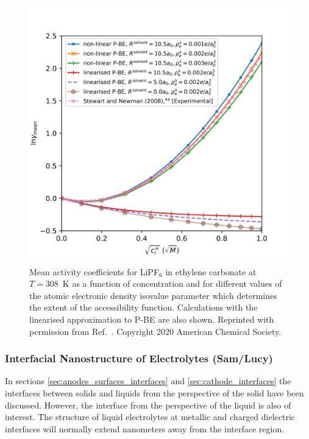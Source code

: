 \documentclass[../main.tex]{subfiles}
\begin{document}
\begin{figure}
    \includegraphics[scale=0.8]{figures/lipf6.png}
    \caption{Mean activity coefficients for LiPF$_6$ in ethylene carbonate at $T=308$~K as a function of concentration and for different values of the atomic electronic density isovalue parameter which determines the extent of the accessibility function. Calculations with the linearised approximation to P-BE are also shown. Reprinted with permission from Ref.~. Copyright 2020 American Chemical Society.}
    \label{fig:ac}
\end{figure}

\subsubsection{Interfacial Nanostructure of Electrolytes (Sam/Lucy)}
In sections \ref{sec:anodes_surfaces_interfaces} and \ref{sec:cathode_interfaces} the interfaces between solids and liquids from the perspective of the solid have been discussed. However, the interface from the perspective of the liquid is also of interest. The structure of liquid electrolytes at metallic\cite{merlet_simulating_2013} and charged dielectric\cite{smith_electrostatic_2016} interfaces will normally extend nanometers away from the interface region.
\end{document}
